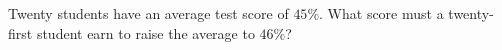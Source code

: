 Twenty students have an average test score of $45\%$. What score must a twenty-first student earn to raise the average to $46\%$?

